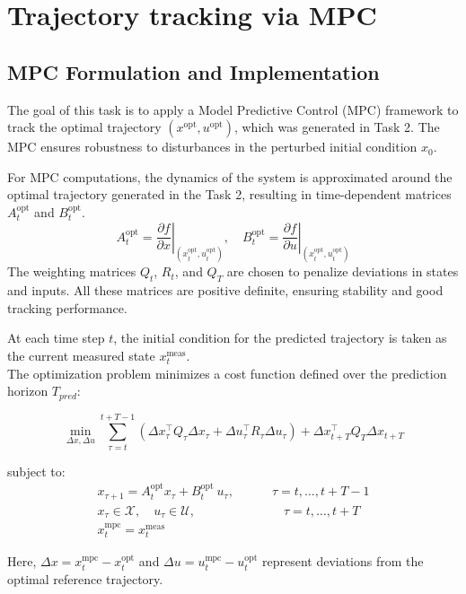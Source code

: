 \chapter{Trajectory tracking via MPC}
 
\section{MPC Formulation and Implementation}
The goal of this task is to apply a Model Predictive Control (MPC) framework to track the optimal trajectory $(x^{\text{opt}}, u^{\text{opt}})$, which was generated in Task 2. The MPC ensures robustness to disturbances in the perturbed initial condition $x_0$.

For MPC computations, the dynamics of the system is approximated around the optimal trajectory generated in the Task 2, resulting in time-dependent matrices $A_t^{\text{opt}}$ and $B_t^{\text{opt}}$.
\begin{equation}
A_t^{\text{opt}} = \left.\frac{\partial f}{\partial x}\right|_{(x_t^{\text{opt}}, u_t^{\text{opt}})}, \quad
B_t^{\text{opt}} = \left.\frac{\partial f}{\partial u}\right|_{(x_t^{\text{opt}}, u_t^{\text{opt}})}
\end{equation}
The weighting matrices $Q_t$, $R_t$, and $Q_T$ are chosen to penalize deviations in states and inputs. All these matrices are positive definite, ensuring stability and good tracking performance.

At each time step $t$, the initial condition for the predicted trajectory is taken as the current measured state $x_t^{\text{meas}}$. 
\\
The optimization problem minimizes a cost function defined over the prediction horizon $T_{pred}$:

\[
\min_{\Delta x, \Delta u} \sum_{\tau=t}^{t+T-1} \left( \Delta x_\tau^\top Q_\tau \Delta x_\tau + \Delta u_\tau^\top R_\tau \Delta u_\tau \right) + \Delta x_{t+T}^\top Q_T \Delta x_{t+T}
\]

subject to:
\[
\begin{array}{l}
x_{\tau+1} = A_t^{\text{opt}}  x_\tau + B_t^{\text{opt}} \ u_\tau, \quad \quad \quad \tau = t, \dots, t+T-1 \\
x_\tau \in \mathcal{X}, \quad u_\tau \in \mathcal{U}, \quad \quad \quad \quad \quad \quad
\quad\tau = t, \dots, t+T \\
x_t^{\text{mpc}} = x_t^{\text{meas}}
\end{array}
\]

Here, $\Delta x = x_t^{\text{mpc}} - x_t^{\text{opt}}$ and $\Delta u = u_t^{\text{mpc}} - u_t^{\text{opt}}$ represent deviations from the optimal reference trajectory. 

